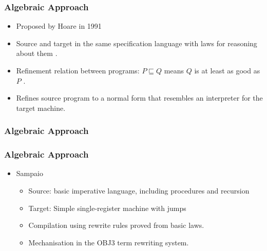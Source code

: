 \documentclass{beamer}
\newcommand{\footmake}[1]{
\ifthenelse{\equal{#1}{}}%
	{}%
	{\footnotetext{#1}}%
}
\newenvironment{slide}[2][fragile,environment=slide]
{\begin{frame}[#1]
	\frametitle{#2}\begin{refsegment}}
{\footmake{\printbibliography[segment=\therefsegment]}\end{refsegment}\end{frame}}
\begin{document}
\begin{slide}{Algebraic Approach}
  \begin{itemize}
  \item Proposed by Hoare in 1991\cite{hoare1991}
  \item Source and target in the same specification language with laws for reasoning about them \cite{hoare1987}.
  \item Refinement relation between programs: $P \sqsubseteq Q$ means $Q$ is at least as good as $P$ \cite{back1981, morris1987, morgan1990}.
  \item Refines source program to a normal form that resembles an interpreter for the target machine.
  \end{itemize}
\end{slide}

\begin{frame}
  \frametitle{Algebraic Approach}
\end{frame}

\begin{slide}{Algebraic Approach}
  \begin{itemize}
  \item Sampaio\cite{hoare1993, sampaio1993, sampaio1997}
    \begin{itemize}
    \item Source: basic imperative language, including procedures and recursion
    \item Target: Simple single-register machine with jumps
    \item Compilation using rewrite rules proved from basic laws.
    \item Mechanisation in the OBJ3 term rewriting system\cite{goguen1988}.
    \end{itemize}
  \end{itemize}
\end{slide}
\end{document}
